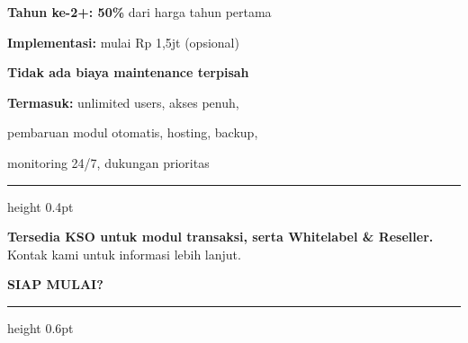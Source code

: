 \documentclass[a4paper]{article}
\newcommand{\sectiontitle}[1]{%
    \vspace{10pt}%
    {\fontsize{13}{16}\selectfont\bfseries\color{BlueDark} #1}\par\vspace{3pt}%
    {\color{BluePrimary}\hrule height 0.6pt}\par\vspace{8pt}%
}
\begin{document}
{\begin{minipage}{\dimexpr\textwidth-2\fboxsep\relax}
\vspace{6pt}

\noindent
\begin{minipage}[t]{0.48\textwidth}
    {\fontsize{9}{12}\selectfont\color{TextDark}%
    \textbf{Tahun ke-2+: 50\%} dari harga tahun pertama\par
    \textbf{Implementasi:} mulai Rp 1,5jt (opsional)\par
    \textbf{Tidak ada biaya maintenance terpisah}}%
\end{minipage}%
\hfill
\begin{minipage}[t]{0.48\textwidth}
    {\fontsize{9}{12}\selectfont\color{TextDark}%
    \textbf{Termasuk:} unlimited users, akses penuh,\par
    pembaruan modul otomatis, hosting, backup,\par
    monitoring 24/7, dukungan prioritas}%
\end{minipage}

\vspace{4pt}
{\color{BluePrimary}\hrule height 0.4pt}
\vspace{4pt}

\begin{center}
{\fontsize{9}{12}\selectfont\color{BluePrimary}
\textbf{Tersedia KSO untuk modul transaksi, serta Whitelabel \& Reseller.} Kontak kami untuk informasi lebih lanjut.}
\end{center}

\vspace{4pt}
\end{minipage}}

\vspace{8pt}

\sectiontitle{SIAP MULAI?}
\end{document}
